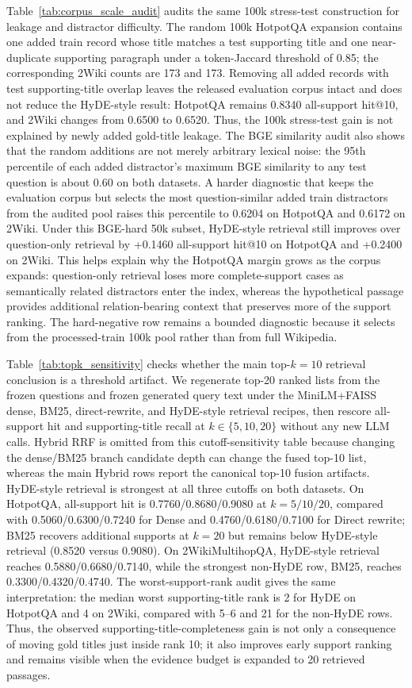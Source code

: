 Table~\ref{tab:corpus_scale_audit} audits the same 100k stress-test construction for leakage and distractor difficulty. The random 100k HotpotQA expansion contains one added train record whose title matches a test supporting title and one near-duplicate supporting paragraph under a token-Jaccard threshold of 0.85; the corresponding 2Wiki counts are 173 and 173. Removing all added records with test supporting-title overlap leaves the released evaluation corpus intact and does not reduce the HyDE-style result: HotpotQA remains 0.8340 all-support hit@10, and 2Wiki changes from 0.6500 to 0.6520. Thus, the 100k stress-test gain is not explained by newly added gold-title leakage. The BGE similarity audit also shows that the random additions are not merely arbitrary lexical noise: the 95th percentile of each added distractor's maximum BGE similarity to any test question is about 0.60 on both datasets. A harder diagnostic that keeps the evaluation corpus but selects the most question-similar added train distractors from the audited pool raises this percentile to 0.6204 on HotpotQA and 0.6172 on 2Wiki. Under this BGE-hard 50k subset, HyDE-style retrieval still improves over question-only retrieval by +0.1460 all-support hit@10 on HotpotQA and +0.2400 on 2Wiki. This helps explain why the HotpotQA margin grows as the corpus expands: question-only retrieval loses more complete-support cases as semantically related distractors enter the index, whereas the hypothetical passage provides additional relation-bearing context that preserves more of the support ranking. The hard-negative row remains a bounded diagnostic because it selects from the processed-train 100k pool rather than from full Wikipedia.

Table~\ref{tab:topk_sensitivity} checks whether the main top-$k=10$ retrieval conclusion is a threshold artifact. We regenerate top-20 ranked lists from the frozen questions and frozen generated query text under the MiniLM+FAISS dense, BM25, direct-rewrite, and HyDE-style retrieval recipes, then rescore all-support hit and supporting-title recall at $k \in \{5,10,20\}$ without any new LLM calls. Hybrid RRF is omitted from this cutoff-sensitivity table because changing the dense/BM25 branch candidate depth can change the fused top-10 list, whereas the main Hybrid rows report the canonical top-10 fusion artifacts. HyDE-style retrieval is strongest at all three cutoffs on both datasets. On HotpotQA, all-support hit is 0.7760/0.8680/0.9080 at $k=5/10/20$, compared with 0.5060/0.6300/0.7240 for Dense and 0.4760/0.6180/0.7100 for Direct rewrite; BM25 recovers additional supports at $k=20$ but remains below HyDE-style retrieval (0.8520 versus 0.9080). On 2WikiMultihopQA, HyDE-style retrieval reaches 0.5880/0.6680/0.7140, while the strongest non-HyDE row, BM25, reaches 0.3300/0.4320/0.4740. The worst-support-rank audit gives the same interpretation: the median worst supporting-title rank is 2 for HyDE on HotpotQA and 4 on 2Wiki, compared with 5--6 and 21 for the non-HyDE rows. Thus, the observed supporting-title-completeness gain is not only a consequence of moving gold titles just inside rank 10; it also improves early support ranking and remains visible when the evidence budget is expanded to 20 retrieved passages.

